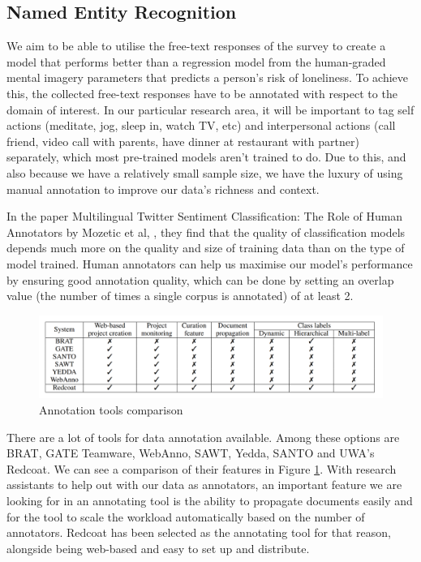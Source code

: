 \documentclass[12pt, a4paper]{article}
\begin{document}
\subsection{Named Entity Recognition}
We aim to be able to utilise the free-text responses of the survey to create a model that performs better than a regression model from the human-graded mental imagery parameters that predicts a person's risk of loneliness. To achieve this, the collected free-text responses have to be annotated with respect to the domain of interest. In our particular research area, it will be important to tag self actions (meditate, jog, sleep in, watch TV, etc) and interpersonal actions (call friend, video call with parents, have dinner at restaurant with partner) separately, which most pre-trained models aren't trained to do. Due to this, and also because we have a relatively small sample size, we have the luxury of using manual annotation to improve our data's richness and context.

In the paper Multilingual Twitter Sentiment Classification: The Role of Human Annotators by Mozetic et al, \cite{Mozeti__2016}, they find that the quality of classification models depends much more on the quality and size of training data than on the type of model trained. Human annotators can help us maximise our model's performance by ensuring good annotation quality, which can be done by setting an overlap value (the number of times a single corpus is annotated) of at least 2.


\begin{figure}
	\includegraphics[scale=0.25]{annotating_tools}
	\caption{Annotation tools comparison}
	\label{annot_table}
\end{figure}

There are a lot of tools for data annotation available. Among these options are BRAT, GATE Teamware, WebAnno, SAWT, Yedda, SANTO and UWA's Redcoat. We can see a comparison of their features in Figure \ref{annot_table}. With research assistants to help out with our data as annotators, an important feature we are looking for in an annotating tool is the ability to propagate documents easily and for the tool to scale the workload automatically based on the number of annotators.  Redcoat \cite{stewart-etal-2019-redcoat} has been selected as the annotating tool for that reason, alongside being web-based and easy to set up and distribute. 
\end{document}
